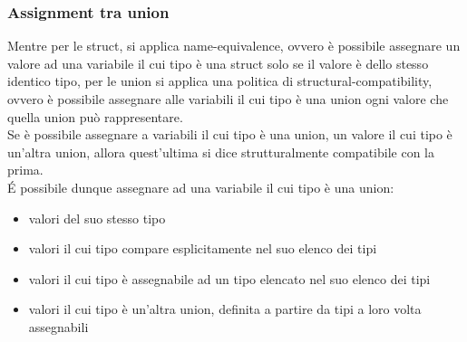 \subsubsection{Assignment tra union}
Mentre per le struct, si applica name-equivalence, ovvero è possibile assegnare un valore ad una variabile 
il cui tipo è una struct solo se il valore è dello stesso identico tipo, per le union si applica una politica 
di structural-compatibility, ovvero è possibile assegnare alle variabili 
il cui tipo è una union ogni valore che quella union può rappresentare. \\ 

Se è possibile assegnare a variabili il cui tipo è una union, un valore il cui tipo 
è un’altra union, allora quest’ultima si dice strutturalmente compatibile con la prima. \\

É possibile dunque assegnare ad una variabile il cui tipo è una union:
\begin{itemize}
    \item valori del suo stesso tipo
    \item valori il cui tipo compare esplicitamente nel suo elenco dei tipi
    \item valori il cui tipo è assegnabile ad un tipo elencato nel suo elenco dei tipi
    \item valori il cui tipo è un’altra union, definita a partire da tipi a loro volta assegnabili
\end{itemize}
\vspace{0.4cm}
